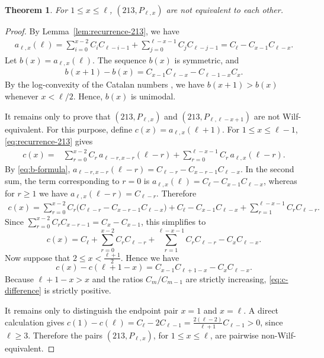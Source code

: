\documentclass[11pt]{article}
\newtheorem{thm}{Theorem}[section]
\begin{document}
\begin{thm}\label{213_no}
For $1\le x\le\ell$, $(213,P_{\ell,x})$ are not equivalent to each other.
\end{thm}

\begin{proof}
    By Lemma~\ref{lem:recurrence-213}, we have
    \begin{align}\label{eq:b-formula}
        a_{\ell,x}(\ell)=\sum_{i=0}^{x-2}C_iC_{\ell-i-1}+\sum_{j=0}^{\ell-x-1}C_jC_{\ell-j-1}=C_\ell-C_{x-1}C_{\ell-x}.
    \end{align}
Let $b(x)=a_{\ell,x}(\ell)$. The sequence $b(x)$ is symmetric, and
\begin{align*}
b(x+1)-b(x)
=
C_{x-1}C_{\ell-x}-C_{\ell-1-x}C_x.
\end{align*}
By the log-convexity of the Catalan numbers
\cite{LiuWang2007}, we have
$b(x+1)>b(x)$ whenever $x<\ell/2$. Hence, $b(x)$ is unimodal.

It remains only to prove that $(213,P_{\ell,x})$ and
$(213,P_{\ell,\ell-x+1})$ are not Wilf-equivalent.
For this purpose, define $c(x)=a_{\ell,x}(\ell+1)$.
For $1\le x\le \ell-1$, \eqref{eq:recurrence-213} gives
\begin{align*}
c(x)
={}&
\sum_{r=0}^{x-2}
C_r\,a_{\ell-r,x-r}(\ell-r)
+
\sum_{r=0}^{\ell-x-1}
C_r\,a_{\ell,x}(\ell-r).
\end{align*}
By \eqref{eq:b-formula}, $a_{\ell-r,x-r}(\ell-r)
=
C_{\ell-r}
-
C_{x-r-1}C_{\ell-x}$.
In the second sum, the term corresponding to $r=0$ is
$a_{\ell,x}(\ell)
=
C_\ell-C_{x-1}C_{\ell-x}$,
whereas for $r\ge1$ we have
$a_{\ell,x}(\ell-r)=C_{\ell-r}$.
Therefore
\begin{align*}
c(x)
={}
\sum_{r=0}^{x-2}
C_r\bigl(C_{\ell-r}-C_{x-r-1}C_{\ell-x}\bigr)
+C_\ell-C_{x-1}C_{\ell-x}
+\sum_{r=1}^{\ell-x-1}C_rC_{\ell-r}.
\end{align*}
Since $\sum_{r=0}^{x-2}C_rC_{x-r-1}
=
C_x-C_{x-1}$,
this simplifies to
\begin{equation*}\label{eq:c-formula}
c(x)
=
C_\ell
+\sum_{r=0}^{x-2}C_rC_{\ell-r}
+\sum_{r=1}^{\ell-x-1}C_rC_{\ell-r}
-C_xC_{\ell-x}.
\end{equation*}
Now suppose that $2\le x<\frac{\ell+1}{2}$.
Hence we have
\begin{equation}\label{eq:c-difference}
c(x)-c(\ell+1-x)
=
C_{x-1}C_{\ell+1-x}
-
C_xC_{\ell-x}.
\end{equation}
Because $\ell+1-x>x$ and the ratios $C_m/C_{m-1}$ are strictly
increasing, \eqref{eq:c-difference} is strictly positive.

It remains only to distinguish the endpoint pair $x=1$ and $x=\ell$.
A direct calculation gives
$
 c(1)-c(\ell)
=
C_\ell-2C_{\ell-1}
=
\frac{2(\ell-2)}{\ell+1}C_{\ell-1}>0$,   
since $\ell\ge3$.
Therefore the pairs $(213,P_{\ell,x})$, for $1\le x\le\ell$, are
pairwise non-Wilf-equivalent.
\end{proof}
\end{document}
